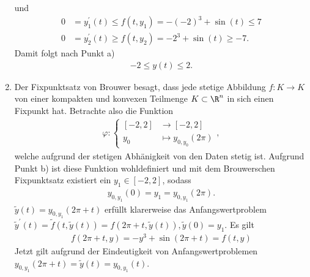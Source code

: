 \begin{solution}
\begin{enumerate}[label = \textbf{\alph*)}]
  und
  \begin{align*}
    0 &= y_1^{\prime}(t) \leq f(t,y_1) = -(-2)^3 + \sin(t) \leq 7 \\
    0 &= y_2^{\prime}(t) \geq f(t,y_2) = -2^3 + \sin(t) \geq -7.
  \end{align*}
  Damit folgt nach Punkt a)
  \begin{align*}
    -2 \leq y(t) \leq 2.
  \end{align*}
  \item Der Fixpunktsatz von Brouwer besagt, dass jede stetige Abbildung $f: K \to K$
  von einer kompakten und konvexen Teilmenge $K \subset \R^n$ in sich einen Fixpunkt hat.
  Betrachte also die Funktion
  \begin{align*}
    \varphi: \begin{cases}
      [-2,2] &\to [-2,2] \\
      y_0 &\mapsto y_{0,y_0}(2\pi)
    \end{cases},
  \end{align*}
  welche aufgrund der stetigen Abhänigkeit von den Daten stetig ist.
  Aufgrund Punkt b) ist diese Funktion wohldefiniert und mit dem Brouwerschen Fixpunktsatz
  existiert ein $y_1 \in [-2,2]$, sodass
  \begin{align*}
    y_{0,y_1}(0) = y_1 = y_{0,y_1}(2\pi).
  \end{align*}
  $\widetilde{y}(t) = y_{0,y_1}(2\pi + t)$ erfüllt klarerweise das Anfangswertproblem $\widetilde{y}^{\prime}(t) =
  \widetilde{f}(t,\widetilde{y}(t)) = f(2\pi+t,\widetilde{y}(t)),
  \widetilde{y}(0) = y_1$. Es gilt
  \begin{align*}
    f(2\pi + t,y) = -y^3 + \sin(2\pi + t) = f(t,y)
  \end{align*}
  Jetzt gilt aufgrund der Eindeutigkeit von Anfangswertproblemen
  $y_{0,y_1}(2\pi + t) = \widetilde{y}(t) = y_{0,y_1}(t)$.
\end{enumerate}
\end{solution}
